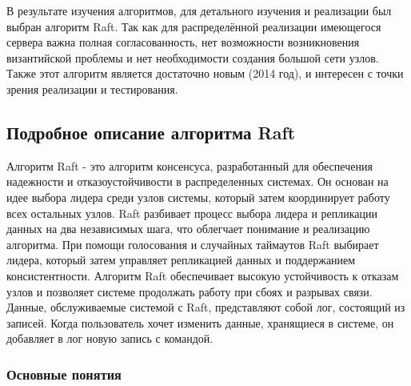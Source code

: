 \documentclass[subf, href, colorlinks=true, 14pt,
times, mtpro, specialist]{disser}
\theoremstyle{definition}
\begin{document}
В результате изучения алгоритмов, для детального изучения и реализации был выбран алгоритм Raft. Так как для распределённой реализации имеющегося сервера важна полная согласованность, нет возможности возникновения византийской проблемы и нет необходимости создания большой сети узлов. Также этот алгоритм является достаточно новым (2014 год), и интересен с точки зрения реализации и тестирования. 

\subsection{Подробное описание алгоритма Raft}

Алгоритм Raft - это алгоритм консенсуса, разработанный для обеспечения надежности и отказоустойчивости в распределенных системах. Он основан на идее выбора лидера среди узлов системы, который затем координирует работу всех остальных узлов. Raft разбивает процесс выбора лидера и репликации данных на два независимых шага, что облегчает понимание и реализацию алгоритма. При помощи голосования и случайных таймаутов Raft выбирает лидера, который затем управляет репликацией данных и поддержанием консистентности. Алгоритм Raft обеспечивает высокую устойчивость к отказам узлов и позволяет системе продолжать работу при сбоях и разрывах связи.
Данные, обслуживаемые системой с Raft, представляют собой лог, состоящий из записей. Когда пользователь хочет изменить данные, хранящиеся в системе, он добавляет в лог новую запись с командой.

\subsubsection{Основные понятия}
\end{document}
